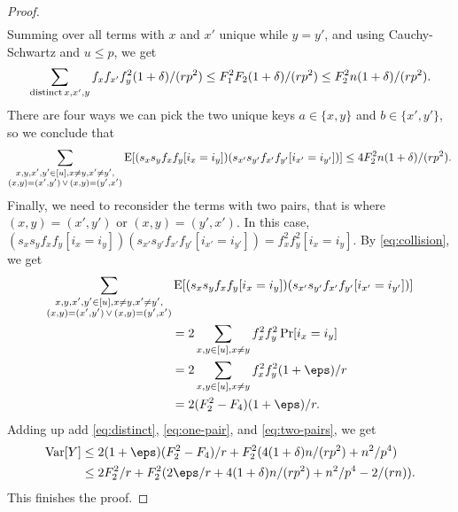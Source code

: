 \begin{proof}
\begin{align*}
    \end{align*}    
    Summing over all terms with $x$ and $x'$ unique while $y=y'$, and
    using Cauchy-Schwartz and $u\leq p$, we get 
    \begin{align*}
        \sum_{{\rm distinct}\,x,x',y} f_xf_{x'}f_y^2 (1 + \delta) /(rp^2) 
            \le F_1^2 F_2 (1 + \delta)/(rp^2)
            \le F_2^2 n(1 + \delta)/(rp^2).
    \end{align*}
    There are four ways we can pick the two unique keys $a\in \{x,y\}$
    and $b\in \{x',y'\}$, so we conclude that
    \begin{equation}\label{eq:one-pair}
        \sum_{\substack{
            x,y,x',y'\in[u], x\neq y, x'\neq y',\\
            (x,y)=(x',y')\,\vee\,(x,y)=(y',x')
        }}
        \operatorname*{E}[(s_x s_y f_x f_y [i_x = i_y]) (s_{x'} s_{y'} f_{x'} f_{y'}[i_{x'} = i_{y'}])]
            \le 4 F_2^2 n(1 + \delta)/(rp^2) .
    \end{equation}
    Finally, we need to reconsider the terms with two pairs, that
    is where $(x,y)=(x',y')$ or $(x,y)=(y',x')$. In
    this case, $(s_x s_y f_x f_y [i_x = i_y]) (s_{x'} s_{y'} f_{x'} f_{y'}[i_{x'} = i_{y'}]) = f_x^2 f_y^2 [i_x = i_y]$.
    By \cref{eq:collision}, we get 
    \begin{equation}\begin{split}    
        \sum_{\substack{
            x,y,x',y'\in[u], x\neq y, x'\neq y',\\
            (x,y)=(x',y')\,\vee\,(x,y)=(y',x')
        }}&
            \E[(s_x s_y f_x f_y [i_x = i_y]) (s_{x'} s_{y'} f_{x'} f_{y'}[i_{x'} = i_{y'}])]
            \\&=2\sum_{x,y\in[u],x\neq y} f_x^2f_y^2 \Pr[i_x=i_y]
            \\&=2\sum_{x,y\in[u],x\neq y} f_x^2f_y^2 (1 + \eps)/r
            \\&=2(F_2^2 - F_4)(1 + \eps)/r .\label{eq:two-pairs}
    \end{split}\end{equation}
    Adding up add \eqref{eq:distinct}, \eqref{eq:one-pair}, and
    \eqref{eq:two-pairs}, we get 
    \begin{align*}
        \Var[Y]
            &\le 2(1 + \eps)(F_2^2 - F_4)/r + F_2^2(4(1 + \delta) n / (rp^2) + n^2/p^4)
            \\&\le 2F_2^2/r + F_2^2 (2\eps/r + 4(1 + \delta)n / (rp^2) + n^2/p^4 - 2 /(rn)) .
    \end{align*}
    This finishes the proof.
\end{proof}

